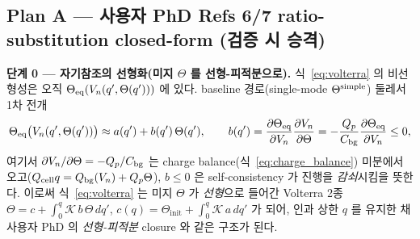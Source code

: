 \subsection{Plan A — 사용자 PhD Refs 6/7 ratio-substitution closed-form (검증 시 승격)}\label{sec:planA}
\textbf{단계 0 — 자기참조의 선형화(미지 $\Theta$ 를 선형-피적분으로).} 식~\eqref{eq:volterra} 의
비선형성은 오직 $\Theta_{\mathrm{eq}}(V_n(q',\Theta(q')))$ 에 있다. baseline 경로(single-mode $\Theta^{\mathrm{simple}}$)
둘레서 1차 전개
\begin{equation}
\Theta_{\mathrm{eq}}\big(V_n(q',\Theta(q'))\big)\approx a(q')+b(q')\,\Theta(q'),\qquad
b(q')=\frac{\partial\Theta_{\mathrm{eq}}}{\partial V_n}\frac{\partial V_n}{\partial\Theta}
=-\frac{Q_p}{C_{\mathrm{bg}}}\frac{\partial\Theta_{\mathrm{eq}}}{\partial V_n}\le0,
\label{eq:selfcoupling}
\end{equation}
여기서 $\partial V_n/\partial\Theta=-Q_p/C_{\mathrm{bg}}$ 는 charge balance(식~\eqref{eq:charge_balance}) 미분에서
오고($Q_{\mathrm{cell}} q=Q_{\mathrm{bg}}(V_n)+Q_p\Theta$), $b\le0$ 은 self-consistency 가 진행을 \emph{감쇠}시킴을 뜻한다.
이로써 식~\eqref{eq:volterra} 는 미지 $\Theta$ 가 \emph{선형}으로 들어간 Volterra 2종
$\Theta=c+\int_0^q\mathcal K\,b\,\Theta\,dq'$, $c(q)=\Theta_\mathrm{init}+\int_0^q\mathcal K\,a\,dq'$ 가 되어,
인과 상한 $q$ 를 유지한 채 사용자 PhD 의 \emph{선형-피적분} closure 와 같은 구조가 된다.

